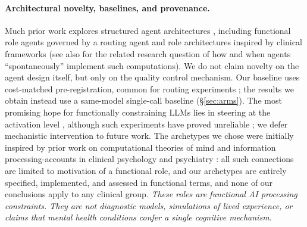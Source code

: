\paragraph{Architectural novelty, baselines, and provenance.}
Much prior work explores structured agent architectures \citep{sumers2024cognitive}, including
functional role agents governed by a routing agent \citep{shang2026theater} and role architectures
inspired by clinical frameworks \citep{wu2026wisemind} (see also \citet{lee2025emergence} for the
related research question of how and when agents ``spontaneously'' implement such computations). We
do not claim novelty on the agent design itself, but only on the quality control mechanism. Our
baseline uses cost-matched pre-registration, common for routing experiments \citep{ong2025routellm};
the results we obtain instead use a same-model single-call baseline (\S\ref{sec:arms}). The most
promising hope for functionally constraining LLMs lies in steering at the activation level
\citep{bas2025steer}, although such experiments have proved unreliable \citep{braun2026steering}; we
defer mechanistic intervention to future work. The archetypes we chose were initially inspired by
prior work on computational theories of mind and information processing-accounts in clinical
psychology and psychiatry
\citep{adams2016computational,addicott2021attention,clance1978impostor,frith2003autism,gruber2011bipolar,kapur2003psychosis}:
all such connections are limited to motivation of a functional role, and our archetypes are entirely
specified, implemented, and assessed in functional terms, and none of our conclusions apply to any
clinical group. \emph{These roles are functional AI processing constraints. They are not diagnostic
models, simulations of lived experience, or claims that mental health conditions confer a single
cognitive mechanism.}
